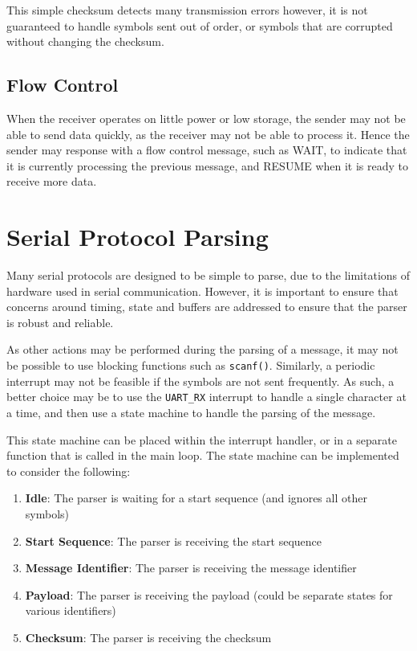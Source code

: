 \documentclass{report}
\begin{document}
This simple checksum detects many transmission errors however, it is not guaranteed to handle
symbols sent out of order, or symbols that are corrupted without changing the checksum.
\subsection{Flow Control}
When the receiver operates on little power or low storage, the sender may
not be able to send data quickly, as the receiver may not be able to process it.
Hence the sender may response with a flow control message, such as WAIT, to indicate that it
is currently processing the previous message, and RESUME when it is ready to receive more data.
\section{Serial Protocol Parsing}
Many serial protocols are designed to be simple to parse, due to the limitations of hardware used in serial
communication. However, it is important to ensure that concerns around timing, state and buffers are
addressed to ensure that the parser is robust and reliable.

As other actions may be performed during the parsing of a message, it may not be possible to use
blocking functions such as \texttt{scanf()}. Similarly, a periodic interrupt may not be feasible
if the symbols are not sent frequently. As such, a better choice may be to use the \texttt{UART_RX}
interrupt to handle a single character at a time, and then use a state machine to handle the
parsing of the message.

This state machine can be placed within the interrupt handler, or in a separate function that is
called in the main loop. The state machine can be implemented to consider the following:
\begin{enumerate}
    \item \textbf{Idle}: The parser is waiting for a start sequence (and ignores all other symbols)
    \item \textbf{Start Sequence}: The parser is receiving the start sequence
    \item \textbf{Message Identifier}: The parser is receiving the message identifier
    \item \textbf{Payload}: The parser is receiving the payload (could be separate states for various identifiers)
    \item \textbf{Checksum}: The parser is receiving the checksum
\end{enumerate}
\end{document}
